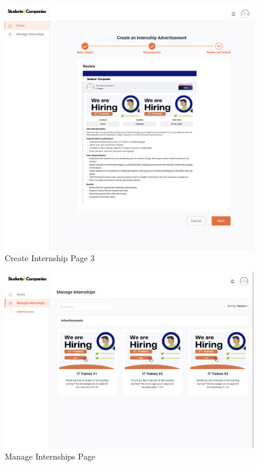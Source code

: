 \documentclass[a4paper,12pt]{article}
\begin{document}
\begin{figure}[H]
    \centering
    \includegraphics[scale = 0.40]{figures/UserInterfaces/Company/CreateInternship3.png}
    \caption{Create Internship Page 3}
     \centering
\end{figure}
\begin{figure}[H]
    \centering
    \includegraphics[scale = 0.40]{figures/UserInterfaces/Company/ManageInternships.png}
    \caption{Manage Internships Page}
     \centering
\end{figure}
\end{document}

